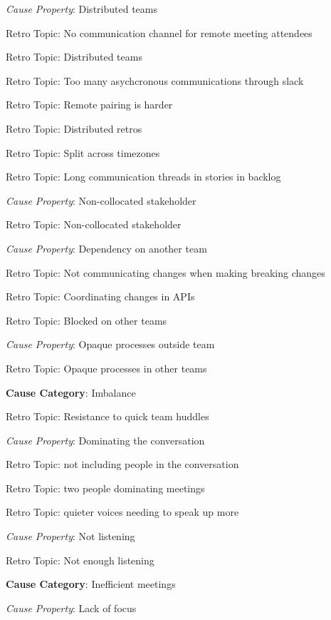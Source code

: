 \quad \quad \textit{Cause Property}: Distributed teams

\quad \quad \quad Retro Topic: No communication channel for remote meeting attendees

\quad \quad \quad Retro Topic: Distributed teams

\quad \quad \quad Retro Topic: Too many asychcronous communications through slack

\quad \quad \quad Retro Topic: Remote pairing is harder

\quad \quad \quad Retro Topic: Distributed retros

\quad \quad \quad Retro Topic: Split across timezones

\quad \quad \quad Retro Topic: Long communication threads in stories in backlog

\quad \quad \textit{Cause Property}: Non-collocated stakeholder

\quad \quad \quad Retro Topic: Non-collocated stakeholder

\quad \quad \textit{Cause Property}: Dependency on another team

\quad \quad \quad Retro Topic: Not communicating changes when making breaking changes

\quad \quad \quad Retro Topic: Coordinating changes in APIs

\quad \quad \quad Retro Topic: Blocked on other teams

\quad \quad \textit{Cause Property}: Opaque processes outside team

\quad \quad \quad Retro Topic: Opaque processes in other teams

\quad \textbf{Cause Category}: Imbalance

\quad \quad Retro Topic: Resistance to quick team huddles

\quad \quad \textit{Cause Property}: Dominating the conversation

\quad \quad \quad Retro Topic: not including people in the conversation

\quad \quad \quad Retro Topic: two people dominating meetings

\quad \quad \quad Retro Topic: quieter voices needing to speak up more

\quad \quad \textit{Cause Property}: Not listening

\quad \quad \quad Retro Topic: Not enough listening

\quad \textbf{Cause Category}: Inefficient meetings

\quad \quad \textit{Cause Property}: Lack of focus

